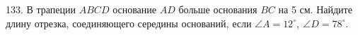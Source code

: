 133. В трапеции $ABCD$ основание $AD$ больше основания $BC$ на 5 см. Найдите длину отрезка, соединяющего середины оснований, если $\angle A=12^\circ,\ \angle D=78^\circ.$\\
